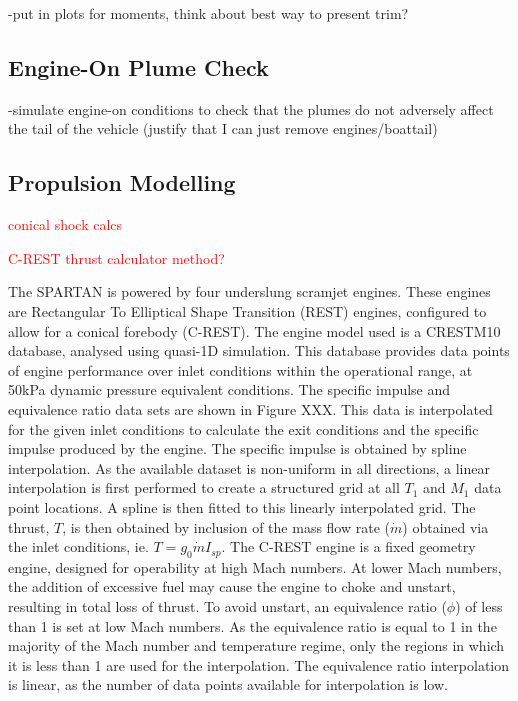 -put in plots for moments, think about best way to present trim?

\subsection{Engine-On Plume Check}
-simulate engine-on conditions to check that the plumes do not adversely affect the tail of the vehicle (justify that I can just remove engines/boattail)
		
		\subsection{Propulsion Modelling}
		
		\textcolor{red}{conical shock calcs}
		
		\textcolor{red}{C-REST thrust calculator method?}
		
		The SPARTAN is powered by four underslung scramjet engines. These engines are Rectangular To Elliptical Shape Transition (REST) engines, configured to allow for a conical forebody (C-REST). The engine model used is a CRESTM10 database\cite{Preller2017}, analysed using quasi-1D simulation.
	This database provides data points of engine performance over inlet conditions within the operational range, at 50kPa dynamic pressure equivalent conditions. The specific impulse and equivalence ratio data sets are shown in Figure XXX. This data is interpolated for the given inlet conditions to calculate the exit conditions and the specific impulse produced by the engine. The specific impulse is obtained by spline interpolation. As the available dataset is non-uniform in all directions, a linear interpolation is first performed to create a structured grid at all $T_1$ and $M_1$ data point locations. A spline is then fitted to this linearly interpolated grid. The thrust, $T$, is then obtained by inclusion of the mass flow rate ($\dot{m}$) obtained via the inlet conditions, ie. $T = g_0\dot{m}I_{sp}$.
	The C-REST engine is a fixed geometry engine, designed for operability at high Mach numbers\cite{Preller2017}. At lower Mach numbers, the addition of excessive fuel may cause the engine to choke and unstart, resulting in total loss of thrust\cite{Preller2017}. To avoid unstart, an equivalence ratio ($\phi$) of less than 1 is set at low Mach numbers. As the equivalence ratio is equal to 1 in the majority of the Mach number and temperature regime, only the regions in which it is less than 1 are used for the interpolation. The equivalence ratio interpolation is linear, as the number of data points available for interpolation is low. 
	
